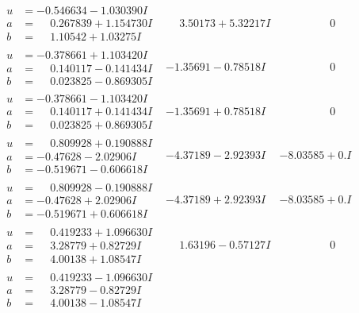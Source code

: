 \documentclass[1p]{elsarticle_modified}
\theoremstyle{definition}
\begin{document}
$$\begin{array}{c|c|c}
\begin{aligned}
u &= -0.546634 - 1.030390 I \\
a &= \phantom{-}0.267839 + 1.154730 I \\
b &= \phantom{-}1.10542 + 1.03275 I\end{aligned}
 & \phantom{-}3.50173 + 5.32217 I & \phantom{-0.000000 } 0 \\ \hline\begin{aligned}
u &= -0.378661 + 1.103420 I \\
a &= \phantom{-}0.140117 - 0.141434 I \\
b &= \phantom{-}0.023825 - 0.869305 I\end{aligned}
 & -1.35691 - 0.78518 I & \phantom{-0.000000 } 0 \\ \hline\begin{aligned}
u &= -0.378661 - 1.103420 I \\
a &= \phantom{-}0.140117 + 0.141434 I \\
b &= \phantom{-}0.023825 + 0.869305 I\end{aligned}
 & -1.35691 + 0.78518 I & \phantom{-0.000000 } 0 \\ \hline\begin{aligned}
u &= \phantom{-}0.809928 + 0.190888 I \\
a &= -0.47628 - 2.02906 I \\
b &= -0.519671 - 0.606618 I\end{aligned}
 & -4.37189 - 2.92393 I & -8.03585 + 0. I\phantom{ +0.000000I} \\ \hline\begin{aligned}
u &= \phantom{-}0.809928 - 0.190888 I \\
a &= -0.47628 + 2.02906 I \\
b &= -0.519671 + 0.606618 I\end{aligned}
 & -4.37189 + 2.92393 I & -8.03585 + 0. I\phantom{ +0.000000I} \\ \hline\begin{aligned}
u &= \phantom{-}0.419233 + 1.096630 I \\
a &= \phantom{-}3.28779 + 0.82729 I \\
b &= \phantom{-}4.00138 + 1.08547 I\end{aligned}
 & \phantom{-}1.63196 - 0.57127 I & \phantom{-0.000000 } 0 \\ \hline\begin{aligned}
u &= \phantom{-}0.419233 - 1.096630 I \\
a &= \phantom{-}3.28779 - 0.82729 I \\
b &= \phantom{-}4.00138 - 1.08547 I\end{aligned}

\end{array}$$
\end{document}
